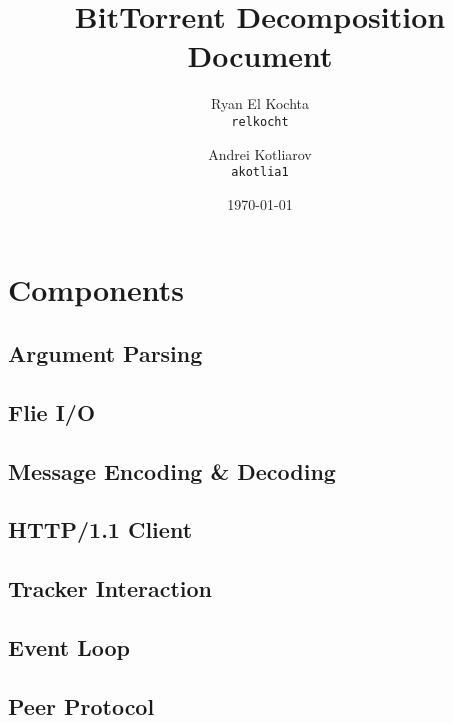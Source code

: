 \documentclass[12pt]{article}
\title{BitTorrent Decomposition Document}
\author{Ryan El Kochta\\
        \texttt{relkocht}
        \and
        Andrei Kotliarov\\
        \texttt{akotlia1}
        }
\date{\today}
\begin{document}
    \maketitle

    \section{Components}

    \subsection{Argument Parsing}
    \subsection{Flie I/O}
    \subsection{Message Encoding \& Decoding}
    \subsection{HTTP/1.1 Client}
    \subsection{Tracker Interaction}
    \subsection{Event Loop}
    \subsection{Peer Protocol}
\end{document}
